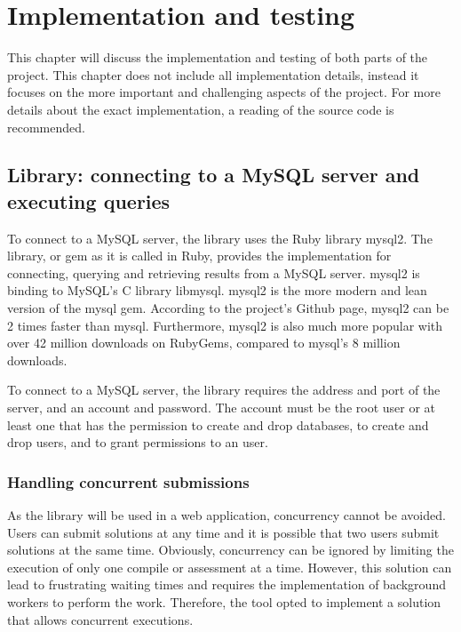  \chapter{Implementation and testing}

This chapter will discuss the implementation and testing of both parts of the project. This chapter does not include all implementation details, instead it focuses on the more important and challenging aspects of the project. For more details about the exact implementation, a reading of the source code is recommended.

\section{Library: connecting to a MySQL server and executing queries} \label{ch:impllib:sec:connecting}
To connect to a MySQL server, the library uses the Ruby library mysql2. The library, or gem as it is called in Ruby, provides the implementation for connecting, querying and retrieving results from a MySQL server. mysql2 is binding to MySQL's C library libmysql. mysql2 is the more modern and lean version of the mysql gem. According to the project's Github page, mysql2 can be 2 times faster than mysql. Furthermore, mysql2 is also much more popular with over 42 million downloads on RubyGems, compared to mysql's 8 million downloads.

To connect to a MySQL server, the library requires the address and port of the server, and an account and password. The account must be the root user or at least one that has the permission to create and drop databases, to create and drop users, and to grant permissions to an user.

\subsection{Handling concurrent submissions}

As the library will be used in a web application, concurrency cannot be avoided. Users can submit solutions at any time and it is possible that two users submit solutions at the same time. Obviously, concurrency can be ignored by limiting the execution of only one compile or assessment at a time. However, this solution can lead to frustrating waiting times and requires the implementation of background workers to perform the work. Therefore, the tool opted to implement a solution that allows concurrent executions.

